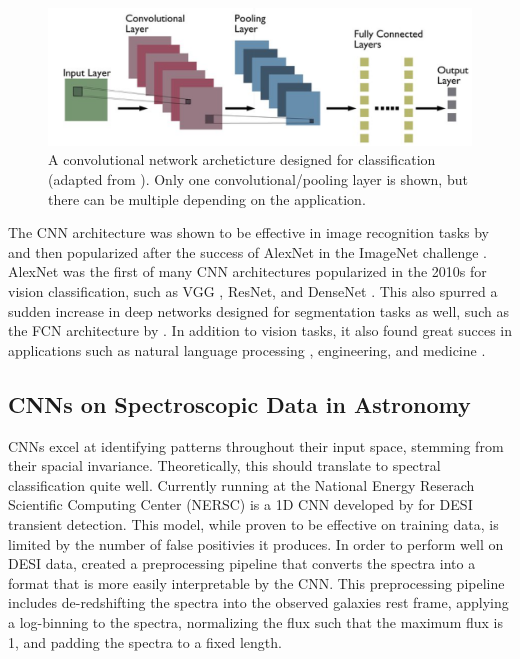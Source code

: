 \begin{figure}[t]
    \centering
    \includegraphics[width=.8\linewidth]{figures/Typical-CNN-architecture.png}
    \caption[Traditional CNN Architecture for Classification]{A convolutional network archeticture designed for classification (adapted from \cite{kumar2022_cnn}). Only
    one convolutional/pooling layer is shown, but there can be multiple depending on the application. }
    \label{fig:CNN}
\end{figure}


The CNN architecture was shown to be effective in image recognition tasks by
\textcite{lecun2004} and then popularized after the success of AlexNet in the 
ImageNet challenge \textcite{krizhevsky2012}. AlexNet was the first of many CNN 
architectures popularized in the 2010s for vision classification, such as VGG \parencite{Simonyan15}, 
ResNet\parencite{he2016deep}, and DenseNet \parencite{Huang2016}. This also spurred a sudden increase in deep networks designed 
for segmentation tasks as well, such as the FCN architecture by \textcite{Shelhamer2016}. In addition to vision tasks, it also found 
great succes in applications such as natural language processing \parencite{Kim2014}, engineering, and 
medicine \parencite{Kiranyaz2021}. 

\subsection{CNNs on Spectroscopic Data in Astronomy}
\label{sec:CNNspectra}
CNNs excel at identifying patterns throughout their input space, stemming from their spacial invariance. 
Theoretically, this should translate to spectral classification quite well. 
Currently running at the National Energy Reserach Scientific Computing Center (NERSC)
is a 1D CNN developed by \textcite{wasserman2021} for DESI transient detection.  This model, while
proven to be effective on training data, is limited by the number of false 
positivies it produces. In order to perform well on DESI data, \textcite{wasserman2021} 
created a preprocessing pipeline that converts the spectra into a format 
that is more easily interpretable by the CNN. This preprocessing pipeline includes 
de-redshifting the spectra into the observed galaxies rest frame, applying a 
log-binning to the spectra, normalizing the flux such that the maximum flux is 1, 
and padding the spectra to a fixed length. 


